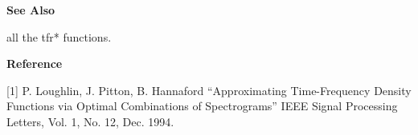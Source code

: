 {\bf \large \sf See Also}\\
\hspace*{1.5cm}
\begin{minipage}[t]{13.5cm}
all the {\ty tfr*} functions.
\end{minipage}
\vspace*{.2cm}


{\bf \large \sf Reference}\\
\hspace*{1.5cm}
\begin{minipage}[t]{13.5cm}
[1] P. Loughlin, J. Pitton, B. Hannaford ``Approximating Time-Frequency
Density Functions via Optimal Combinations of Spectrograms'' IEEE Signal
Processing Letters, Vol. 1, No. 12, Dec. 1994. 
\end{minipage}
